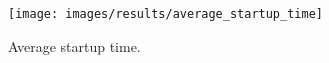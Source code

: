 
\begin{figure}[H]
	\centering
    \texttt{[image: images/results/average\_startup\_time]}
    \caption{Average startup time.}
    \label{fig:average_startup_time}
\end{figure}
